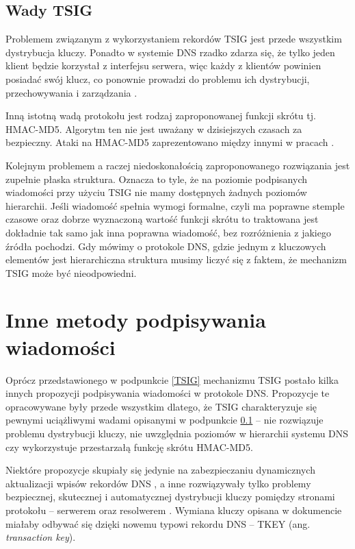 \subsection{Wady TSIG}
\label{wady-tsig}
Problemem związanym z wykorzystaniem rekordów TSIG jest przede wszystkim dystrybucja kluczy. Ponadto w systemie DNS rzadko zdarza się,
że tylko jeden klient będzie korzystał z interfejsu serwera, więc każdy z klientów powinien posiadać swój klucz, co ponownie prowadzi
do problemu ich dystrybucji, przechowywania i zarządzania \cite{nask-tsig}.

Inną istotną wadą protokołu jest rodzaj zaproponowanej funkcji skrótu tj. HMAC-MD5. Algorytm ten nie jest uważany w dzisiejszych czasach
za bezpieczny. Ataki na HMAC-MD5 zaprezentowano między innymi w pracach \cite{hmac-md5-attack, hmac-md5-cryptoanalisys}.

Kolejnym problemem a raczej niedoskonałością zaproponowanego rozwiązania jest zupełnie płaska struktura. Oznacza to tyle, że na
poziomie podpisanych wiadomości przy użyciu TSIG nie mamy dostępnych żadnych poziomów hierarchii. Jeśli wiadomość spełnia wymogi
formalne, czyli ma poprawne stemple czasowe oraz dobrze wyznaczoną wartość funkcji skrótu to traktowana jest dokładnie tak samo
jak inna poprawna wiadomość, bez rozróżnienia z jakiego źródła pochodzi. Gdy mówimy o protokole DNS, gdzie jednym z kluczowych
elementów jest hierarchiczna struktura musimy liczyć się z faktem, że mechanizm TSIG może być nieodpowiedni.

\section{Inne metody podpisywania wiadomości}
Oprócz przedstawionego w podpunkcie \ref{TSIG} mechanizmu TSIG postało kilka innych propozycji podpisywania wiadomości w protokole DNS.
Propozycje te opracowywane były przede wszystkim dlatego, że TSIG charakteryzuje się pewnymi uciążliwymi wadami opisanymi w podpunkcie
\ref{wady-tsig} -- nie rozwiązuje problemu dystrybucji kluczy, nie uwzględnia poziomów w hierarchii systemu DNS czy wykorzystuje
przestarzałą funkcję skrótu HMAC-MD5.

Niektóre propozycje skupiały się jedynie na zabezpieczaniu dynamicznych aktualizacji wpisów rekordów DNS \cite{RFC2137}, a inne
rozwiązywały tylko problemy bezpiecznej, skutecznej i automatycznej dystrybucji kluczy pomiędzy stronami protokołu -- serwerem oraz
resolwerem \cite{RFC2930}. Wymiana kluczy opisana w dokumencie \cite{RFC2930} miałaby odbywać się dzięki nowemu typowi rekordu
DNS -- TKEY (ang. \textit{transaction key}).

